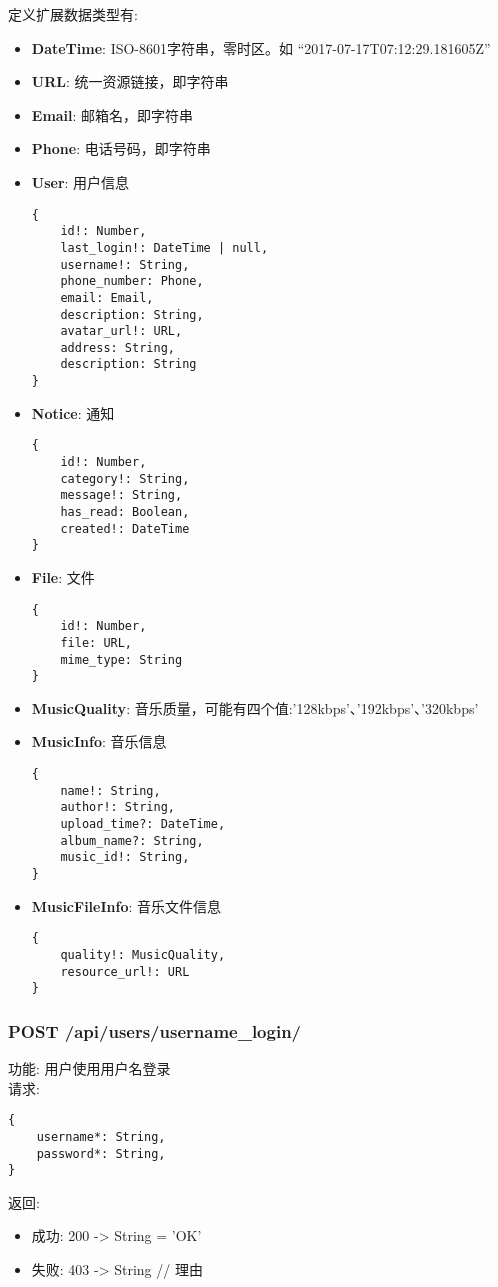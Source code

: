 \begin{enumerate}
定义扩展数据类型有: 
\begin{itemize}
	\item \textbf{DateTime}: ISO-8601字符串，零时区。如 “2017-07-17T07:12:29.181605Z”
	\item \textbf{URL}: 统一资源链接，即字符串
	\item \textbf{Email}: 邮箱名，即字符串
	\item \textbf{Phone}: 电话号码，即字符串
	\item \textbf{User}: 用户信息
\begin{lstlisting}[numbers=none, frame=none]
{
    id!: Number,
    last_login!: DateTime | null,
    username!: String,
    phone_number: Phone,
    email: Email,
    description: String,
    avatar_url!: URL,
    address: String,
    description: String
}
\end{lstlisting}
	\item \textbf{Notice}: 通知
\begin{lstlisting}[numbers=none, frame=none]
{
    id!: Number,
    category!: String,
  	message!: String,
  	has_read: Boolean,
  	created!: DateTime
}
\end{lstlisting}
	\item \textbf{File}: 文件
\begin{lstlisting}[numbers=none, frame=none]
{
    id!: Number,
    file: URL,
    mime_type: String
}
\end{lstlisting}
\item \textbf{MusicQuality}: 音乐质量，可能有四个值:'128kbps'、'192kbps'、'320kbps'
\item \textbf{MusicInfo}: 音乐信息
\begin{lstlisting}[numbers=none, frame=none]
{
    name!: String,
    author!: String,
    upload_time?: DateTime,
    album_name?: String,
    music_id!: String,
}
\end{lstlisting}
\item \textbf{MusicFileInfo}: 音乐文件信息
\begin{lstlisting}[numbers=none, frame=none]
{
    quality!: MusicQuality,
    resource_url!: URL
}
\end{lstlisting}
\end{itemize}


\subsubsection{POST /api/users/username\_login/}

\noindent
功能: 用户使用用户名登录\\
请求:
\begin{lstlisting}[numbers=none, frame=none]
{
    username*: String,
    password*: String,
}
\end{lstlisting}
返回:
\begin{itemize}
	\item 成功:  200 -> String = 'OK'
	\item 失败:  403 -> String // 理由
\end{itemize}


\end{enumerate}
